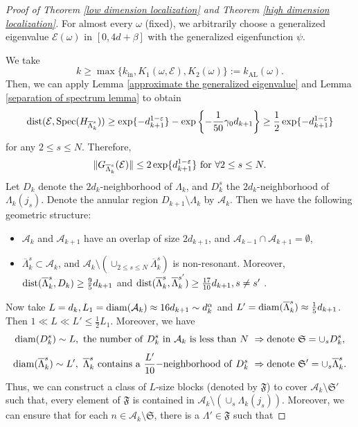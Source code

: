 \documentclass[11pt,reqno,UTF8,twoside]{amsart}
\newcommand{\spec}{{\rm Spec}}
\newcommand{\barLambda}{\overline{\Lambda}}
\newcommand{\mcA}{\mathcal{A}}
\newcommand{\mcE}{\mathcal{E}}
\newcommand{\dist}{{\rm dist}}
\newcommand{\diam}{{\rm diam}}
\theoremstyle{definition}
\numberwithin{equation}{section}
\begin{document}
\begin{proof}[Proof of Theorem \ref{low dimension localization} and Theorem \ref{high dimension localization}]
For almost every $\omega$ (fixed), we arbitrarily choose a generalized eigenvalue $\mcE(\omega)$ in $[0,4d+\beta]$ with the generalized eigenfunction $\psi$. 

We take 
\[ k\geq \max\{ k_{\text{in}}, K_1(\omega,\mcE),K_2(\omega)\}:= k_{\text{AL}}(\omega).\]
Then, we can apply Lemma \ref{approximate the generalized eigenvalue} and Lemma \ref{separation of spectrum lemma} to obtain
\begin{align*}
  \dist(\mcE,\spec(H_{\barLambda_k^s}) ) \geq  \exp \{-d_{k+1}^{1-\varepsilon} \}- \exp\left\{  -\frac{1}{50}\gamma_0 d_{k+1}      \right\} \geq \frac{1}{2}\exp \{-d_{k+1}^{1-\varepsilon} \} 
\end{align*}
for any $2\leq s\leq N$. Therefore, 
\begin{equation}\label{resonant block L2 norm}
  \| G_{\barLambda_k^s}(\mcE)\|\leq 2 \exp\{d_{k+1}^{1-\varepsilon}\}\ {\rm for} \ \forall   2\leq s\leq N.
\end{equation}
Let $D_k$ denote the $2d_{k}$-neighborhood of $\Lambda_k$, and $D_k^s$ the $2d_k$-neighborhood of $\Lambda_k(j_s)$. Denote the annular region $D_{k+1}\setminus \Lambda_k$ by $\mcA_k$. Then we have the following geometric structure: 
\begin{itemize}
  \item $\mcA_k$ and $\mcA_{k+1}$ have an overlap of size  $2d_{k+1}$, and $\mcA_{k-1}\cap\mcA_{k+1}=\emptyset$, 
  \item $\barLambda_k^s\subset \mcA_k$, and  $\mcA_k\setminus (\cup_{2\leq s\leq N} \barLambda_k^s)$ is non-resonant. Moreover, $\dist(\barLambda_k^s,D_k)\geq \frac{9}{5}d_{k+1}$ and $\dist(\barLambda_k^s,\barLambda_k^{s'})\geq \frac{17}{10}d_{k+1},s\neq s'$ .
\end{itemize}
Now take $L=d_{k},L_1=\diam(\mcA_k)\approx 16 d_{k+1}\sim d_k^{\alpha}$ and $L'=\diam(\barLambda_k^s)\approx \frac{1}{5}d_{k+1}$. Then $1\ll L \ll L'\leq \frac{1}{2}L_1$. Moreover, we have 
\[\diam (D_k^s)\sim L, \ {\rm the \ number \ of \ } D_k^s \ {\rm in} \ \mcA_k \ {\rm is \  less \ than \ } N \ \Rightarrow {\rm denote} \ \mathfrak{S}=\cup_s D_k^s, \]
\[\diam(\barLambda_k^s)\sim L',\  \barLambda_k^s \ {\rm contains\ a}  \  \frac{L'}{10}{\rm-neighborhood\ of \ } D_k^s\ \Rightarrow {\rm denote} \ \mathfrak{S}' =\cup_s \barLambda_k^s.\]
Thus, we can construct a class of $L$-size blocks (denoted by $\mathfrak{F}$) to cover  $\mcA_k\setminus \mathfrak{S}'$ such that,  every element of $\mathfrak{F}$ is contained in $\mcA_{k}\setminus (\cup_s \Lambda_k(j_s))$. Moreover, we can ensure that for each $n\in \mcA_k\setminus\mathfrak{S}$, there is a $\Lambda'\in \mathfrak{F}$ such that 

\end{proof}
\end{document}
